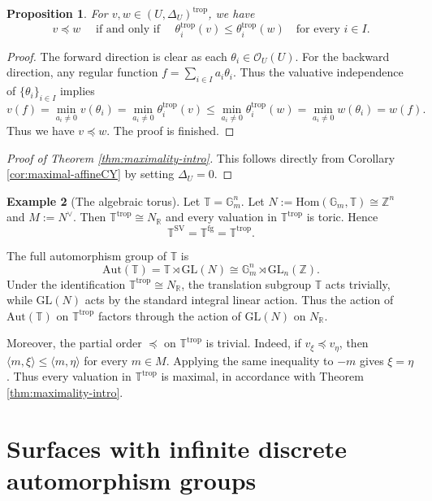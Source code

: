 \documentclass[reqno, 12pt]{amsart}
\newtheorem{prop}{Proposition}[section]
\theoremstyle{definition}
\newtheorem{expl}[prop]{Example}
\newcommand{\bR}{\mathbb{R}}
\newcommand{\bZ}{\mathbb{Z}}
\newcommand{\bG}{\mathbb{G}}
\newcommand{\bT}{\mathbb{T}}
\newcommand{\cO}{\mathcal{O}}
\newcommand{\Hom}{\mathrm{Hom}}
\newcommand{\Aut}{\mathrm{Aut}}
\newcommand{\trop}{\mathrm{trop}}
\newcommand{\GL}{\mathrm{GL}}
\newcommand{\SV}{\mathrm{SV}}
\newcommand{\rfg}{\mathrm{fg}}
\numberwithin{equation}{section}
\begin{document}
\begin{prop}\label{prop:theta-order}
For $v,w\in (U,\Delta_U)^{\trop}$, we have
\[
v\preceq w
\quad\textrm{ if and only if }\quad
\theta_i^{\trop}(v)
\leq
\theta_i^{\trop}(w)
\quad\text{for every }i\in I.
\]
\end{prop}

\begin{proof}
The forward direction is clear as each $\theta_i\in \cO_U(U)$. For the backward direction, any regular function $f = \sum_{i\in I} a_i \theta_i$. Thus the valuative independence of $\{\theta_i\}_{i\in I}$ implies
\[
v(f) = \min_{a_i\neq 0} v(\theta_i)= \min_{a_i\neq 0} \theta_i^{\trop}(v)\leq  \min_{a_i\neq 0} \theta_i^{\trop}(w)=\min_{a_i\neq 0} w(\theta_i) = w(f).
\]
Thus we have $v\preceq w$. The proof is finished.
\end{proof}


\begin{proof}[Proof of Theorem \ref{thm:maximality-intro}]
This follows directly from Corollary \ref{cor:maximal-affineCY} by setting $\Delta_U=0$.
\end{proof}

\begin{expl}[The algebraic torus]\label{ex:torus}
Let $\bT=\bG_m^n$. Let $N:=\Hom(\bG_m,\bT)\cong \bZ^n$ and $M:=N^\vee$. Then 
$\bT^{\trop}\cong N_{\bR}$
and every valuation in $\bT^{\trop}$ is toric. Hence
\[
\bT^{\SV}=\bT^{\rfg}=\bT^{\trop}.
\]


The full automorphism group of $\bT$ is
\[
\Aut(\bT)=\bT\rtimes \GL(N)
       \cong \bG_m^n\rtimes \GL_n(\bZ).
\]
Under the identification $\bT^{\trop}\cong N_{\bR}$, the translation subgroup $\bT$ acts trivially, while $\GL(N)$ acts by the standard integral linear action. Thus the action of $\Aut(\bT)$ on $\bT^{\trop}$ factors through the action of $\GL(N)$ on $N_{\bR}$.

Moreover, the partial order $\preceq$ on $\bT^{\trop}$ is trivial. Indeed, if
$v_\xi\preceq v_\eta$, then
$\langle m,\xi\rangle\le \langle m,\eta\rangle$
for every $m\in M$. Applying the same inequality to $-m$ gives
$\xi=\eta$. Thus every valuation in $\bT^{\trop}$ is maximal, in accordance with Theorem \ref{thm:maximality-intro}.
\end{expl}


\section{Surfaces with infinite discrete automorphism groups}\label{sec:surfaces}
\end{document}
